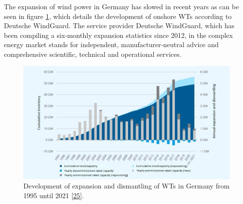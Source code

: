 \documentclass[a4paper,11pt]{article}
\begin{document}
The expansion of wind power in Germany has slowed in recent years as can be seen in figure \ref{fig:winddevelopment}, which details the development of onshore WTs according to Deutsche WindGuard. The service provider Deutsche WindGuard, which has been compiling a six-monthly expansion statistics since 2012, in the complex energy market stands for independent, manufacturer-neutral advice and comprehensive scientific, technical and operational services.


\begin{figure}

{\centering \includegraphics[width=1\linewidth]{figures/wind2} 

}

\caption{Development of expansion and dismantling of WTs in Germany from 1995 until 2021 {[}\protect\hyperlink{ref-DeutscheWindGuard.2021}{25}{]}.}\label{fig:winddevelopment}
\end{figure}
\end{document}
